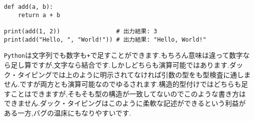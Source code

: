 \documentclass[a4paper]{ltjsreport}
\newcommand{\terlogy}[2][|]{\colorbox{terlogy}{\texttt{\lstinline#1#2#1}}}
\begin{document}
\begin{zenn}
  \begin{lstlisting}[language=mypy]
def add(a, b):
    return a + b

print(add(1, 2))                # 出力結果: 3
print(add("Hello, ", "World!")) # 出力結果: "Hello, World!"

\end{lstlisting}
\end{zenn}

\terlogy{Python}は文字列でも数字も\terlogy{+}で足すことができます.もちろん意味は違って数字なら足し算ですが,文字なら結合です.しかしどちらも演算可能ではあります.ダック・タイピングでは上のように明示されてなければ引数の型をも型検査に通しません.ですが両方とも演算可能なのでゆるされます.構造的型付けではどちらも足すことはできますが,そもそも型の構造が一致してないのでこのような書き方はできません.ダック・タイピングはこのように柔軟な記述ができるという利益がある一方,バグの温床にもなりやすいです.
\end{document}

